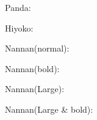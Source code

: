 \documentclass[platex]{jsarticle}
\begin{document}
Panda: \panda

Hiyoko: \hiyoko

Nannan(normal): \nannan

Nannan(bold): \textbf{\nannan}

Nannan(Large): {\Large \nannan}

Nannan(Large \& bold): {\Large \textbf{\nannan}}
\end{document}
